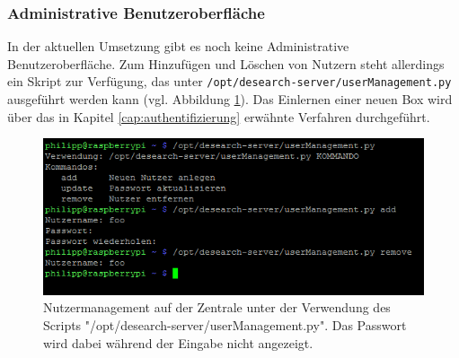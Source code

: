 \subsubsection{Administrative Benutzeroberfläche}
In der aktuellen Umsetzung gibt es noch keine Administrative Benutzeroberfläche. Zum Hinzufügen und Löschen von Nutzern steht allerdings ein Skript zur Verfügung, das unter  \texttt{/opt/desearch-server/userManagement.py} ausgeführt werden kann (vgl. Abbildung \ref{img:userManagement}).
Das Einlernen einer neuen Box wird über das in Kapitel \ref{cap:authentifizierung} erwähnte Verfahren durchgeführt.

\begin{figure}
	\centering
	\includegraphics[width=1.0\linewidth]{images/userManagement}
	\caption[Nutzermanagement auf der Zentrale]{Nutzermanagement auf der Zentrale unter der Verwendung des Scripts "/opt/desearch-server/userManagement.py". Das Passwort wird dabei während der Eingabe nicht angezeigt.}
	\label{img:userManagement}
\end{figure}


